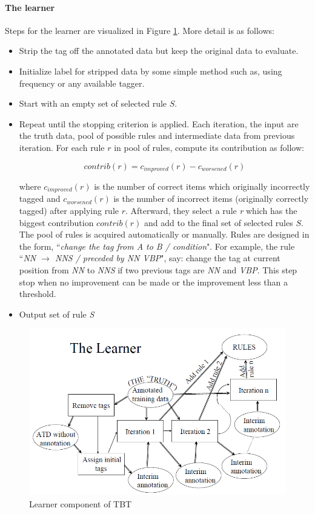 \paragraph{The learner} Steps for the learner are visualized in Figure \ref{fig:tbt_learner}. More detail is as follows:
 
\begin{itemize}
\item Strip the tag off the annotated data but keep the original data to evaluate. 
\item Initialize label for stripped data by some simple method such as, using frequency or any available tagger. 
\item Start with an empty set of selected rule $S$. 
\item Repeat until the stopping criterion is applied. Each iteration, the input are the truth data, pool of possible rules and intermediate data from previous iteration. For each rule $r$ in pool of rules, compute its contribution as follow:

\parbox{\linewidth}{$$contrib(r) = c_{improved}(r) - c_{worsened}(r) $$ }
where $c_{improved}(r)$ is the number of correct items which originally incorrectly tagged and $c_{worsened}(r)$ is the number of incorrect items (originally  correctly tagged) after  applying rule $r$. Afterward, they select a rule \textit{r} which has the biggest contribution $contrib(r)$ and add to the final set of selected rules $S$. The pool of rules is acquired automatically or manually. Rules are designed in the form, ``\textit{change the tag from A to B / condition}". For example, the rule ``\textit{NN $\rightarrow$ NNS / preceded by NN VBP}", say: change the tag at current position from \textit{NN} to \textit{NNS} if two previous tags are \textit{NN} and \textit{VBP}. This step stop when no improvement can be made or the improvement less than a threshold. 
\item Output set of rule \textit{S}
\end{itemize}

\begin{figure}
\centering
\includegraphics[scale=0.6]{Figures/TBT_learner}
\caption{Learner component of TBT }
\label{fig:tbt_learner}
\end{figure}

